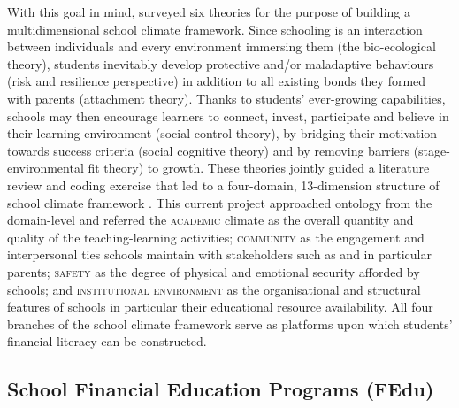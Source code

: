 \documentclass[a4paper,11pt,UKenglish,twoside,openright]{report}\usepackage[]{graphicx}\usepackage[]{color}
\begin{document}
With this goal in mind, \textcite{wang:2016} surveyed six theories for the purpose of building a multidimensional school climate framework. Since schooling is an interaction between individuals and every environment immersing them (the bio-ecological theory), students inevitably develop protective and/or maladaptive behaviours (risk and resilience perspective) in addition to all existing bonds they formed with parents (attachment theory). Thanks to students' ever-growing capabilities, schools may then encourage learners to connect, invest, participate and believe in their learning environment (social control theory), by bridging their motivation towards success criteria (social cognitive theory) and by removing barriers (stage-environmental fit theory) to growth. These theories jointly guided a literature review and coding exercise that led to a four-domain, 13-dimension structure of school climate framework \parencite[see Figure 1,][p. 318]{wang:2016}. This current project approached  ontology from the domain-level and referred the \textsc{academic} climate as the overall quantity and quality of the teaching-learning activities; \textsc{community} as the engagement and interpersonal ties schools maintain with stakeholders such as and in particular parents; \textsc{safety} as the degree of physical and emotional security afforded by schools; and \textsc{institutional environment} as the organisational and structural features of schools in particular their educational resource availability. All four branches of the school climate framework serve as platforms upon which students' financial literacy can be constructed.

\subsection{School Financial Education Programs (FEdu)}
\end{document}

